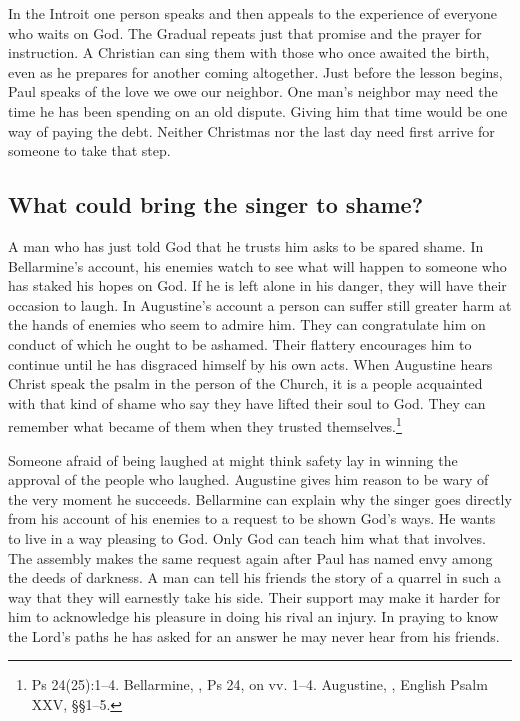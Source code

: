 In the Introit one person speaks and then appeals to the experience of everyone who waits on God. The Gradual repeats just that promise and the prayer for instruction. A Christian can sing them with those who once awaited the birth, even as he prepares for another coming altogether. Just before the lesson begins, Paul speaks of the love we owe our neighbor. One man's neighbor may need the time he has been spending on an old dispute. Giving him that time would be one way of paying the debt. Neither Christmas nor the last day need first arrive for someone to take that step.

\subsection{What could bring the singer to shame?}

A man who has just told God that he trusts him asks to be spared shame. In Bellarmine's account, his enemies watch to see what will happen to someone who has staked his hopes on God. If he is left alone in his danger, they will have their occasion to laugh. In Augustine's account a person can suffer still greater harm at the hands of enemies who seem to admire him. They can congratulate him on conduct of which he ought to be ashamed. Their flattery encourages him to continue until he has disgraced himself by his own acts. When Augustine hears Christ speak the psalm in the person of the Church, it is a people acquainted with that kind of shame who say they have lifted their soul to God. They can remember what became of them when they trusted themselves.\footnote{Ps 24(25):1--4. Bellarmine, , Ps 24, on vv. 1--4. Augustine, , English Psalm XXV, §§1--5.}

Someone afraid of being laughed at might think safety lay in winning the approval of the people who laughed. Augustine gives him reason to be wary of the very moment he succeeds. Bellarmine can explain why the singer goes directly from his account of his enemies to a request to be shown God's ways. He wants to live in a way pleasing to God. Only God can teach him what that involves. The assembly makes the same request again after Paul has named envy among the deeds of darkness. A man can tell his friends the story of a quarrel in such a way that they will earnestly take his side. Their support may make it harder for him to acknowledge his pleasure in doing his rival an injury. In praying to know the Lord's paths he has asked for an answer he may never hear from his friends.

